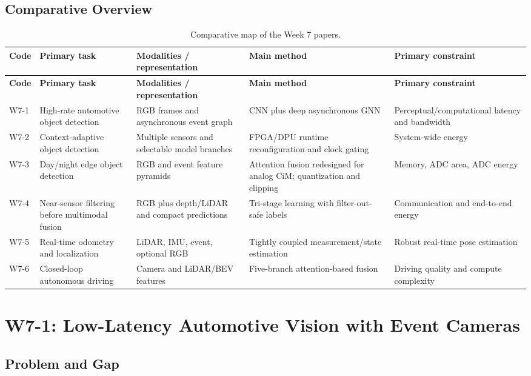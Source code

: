 \clearpage
\begin{landscape}
\section{Comparative Overview}
\small
\begin{longtable}{@{}p{1.2cm}p{4.0cm}p{4.6cm}p{5.2cm}p{4.0cm}@{}}
\caption{Comparative map of the Week 7 papers.}
\label{tab:week7-overview}\\
\toprule
\textbf{Code} & \textbf{Primary task} & \textbf{Modalities / representation} & \textbf{Main method} & \textbf{Primary constraint} \\
\midrule
\endfirsthead
\toprule
\textbf{Code} & \textbf{Primary task} & \textbf{Modalities / representation} & \textbf{Main method} & \textbf{Primary constraint} \\
\midrule
\endhead
W7-1 & High-rate automotive object detection & RGB frames and asynchronous event graph & CNN plus deep asynchronous GNN & Perceptual/computational latency and bandwidth \\
W7-2 & Context-adaptive object detection & Multiple sensors and selectable model branches & FPGA/DPU runtime reconfiguration and clock gating & System-wide energy \\
W7-3 & Day/night edge object detection & RGB and event feature pyramids & Attention fusion redesigned for analog CiM; quantization and clipping & Memory, ADC area, ADC energy \\
W7-4 & Near-sensor filtering before multimodal fusion & RGB plus depth/LiDAR and compact predictions & Tri-stage learning with filter-out-safe labels & Communication and end-to-end energy \\
W7-5 & Real-time odometry and localization & LiDAR, IMU, event, optional RGB & Tightly coupled measurement/state estimation & Robust real-time pose estimation \\
W7-6 & Closed-loop autonomous driving & Camera and LiDAR/BEV features & Five-branch attention-based fusion & Driving quality and compute complexity \\
\bottomrule
\end{longtable}
\end{landscape}

\section{W7-1: Low-Latency Automotive Vision with Event Cameras}

\subsection{Problem and Gap}

